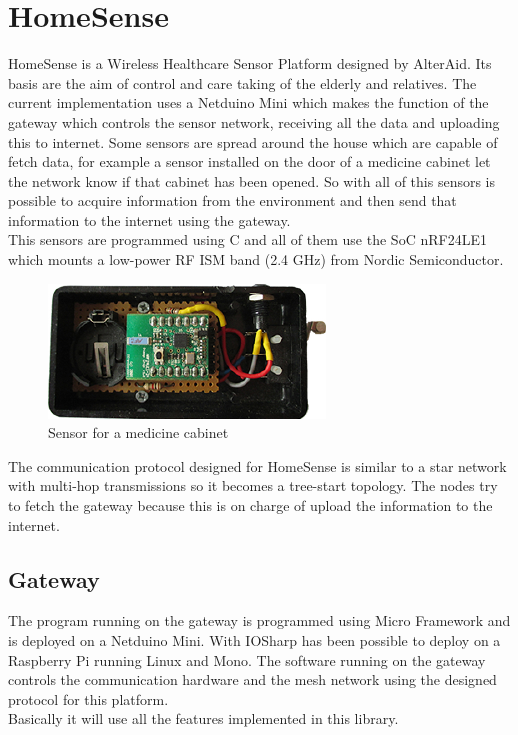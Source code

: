 \section{HomeSense}\label{S:IOEx-HomeSense}
HomeSense is a Wireless Healthcare Sensor Platform designed by AlterAid. Its basis are the aim of control and care taking of the elderly and relatives. The current implementation uses a Netduino Mini which makes the function of the gateway which controls the sensor network, receiving all the data and uploading this to internet.
Some sensors are spread around the house which are capable of fetch     data, for example a sensor installed on the door of a medicine cabinet let the network know if that cabinet has been opened. So with all of this sensors is possible to acquire information from the environment and then send that information to the internet using the gateway.
\\
This sensors are programmed using C and all of them use the \gls{SoC} nRF24LE1 which mounts a low-power RF ISM band (2.4 GHz) from Nordic Semiconductor.
\begin{figure}[H]\begin{center}
 \centering
  \captionsetup{justification=centering}
  \includegraphics[scale=1]{pictures/examples/sensor}
  \caption{Sensor for a medicine cabinet\label{fig:IOEx-UART}}
\end{center}\end{figure}
The communication protocol designed for HomeSense is similar to a star network with multi-hop transmissions so it becomes a tree-start topology. The nodes try to fetch the gateway because this is on charge of upload the information to the internet.

\subsection{Gateway}\label{SS:IOEx-HomeSense-Gateway}
The program running on the gateway is programmed using Micro Framework and is deployed on a Netduino Mini. With IOSharp has been possible to deploy on a Raspberry Pi running Linux and Mono. The software running on the gateway controls the communication hardware and the mesh network using the designed protocol for this platform.
\\
Basically it will use all the features implemented in this library.

